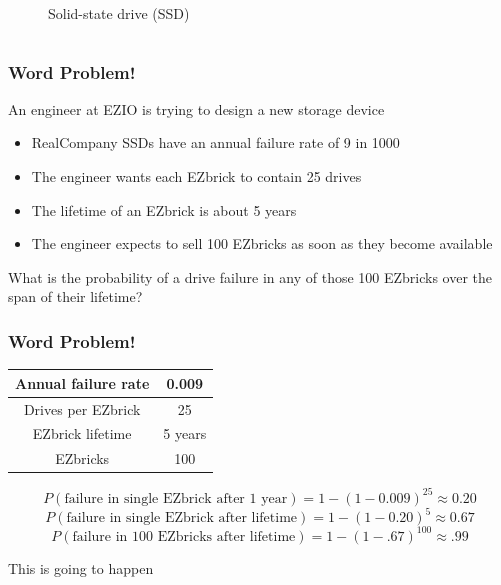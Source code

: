 \documentclass{beamer}
\theoremstyle{mystyle}
\begin{document}
\begin{frame}
\begin{columns}
\begin{figure}
			\caption{Solid-state drive (SSD)}
		\end{figure}
\end{columns}
\end{frame}


\begin{frame}
\frametitle{Word Problem!}
An engineer at EZIO is trying to design a new storage device
\vspace{0.2in}
	\begin{itemize}
		\item RealCompany SSDs have an annual failure rate of 9 in 1000
		\pause
		\vspace{0.1in}
		\item The engineer wants each EZbrick to contain 25 drives
		\pause
		\vspace{0.1in}
		\item The lifetime of an EZbrick is about 5 years
		\pause
		\vspace{0.1in} 
		\item The engineer expects to sell 100 EZbricks as soon as they become available
	\end{itemize}
\pause
\vspace{0.2in}
What is the probability of a drive failure in any of those 100 EZbricks over the span of their lifetime?

	
\end{frame}

\begin{frame}
\frametitle{Word Problem!}

\begin{center}
	\begin{tabular}{ | c | c | }
		\hline Annual failure rate & 0.009 \\
		\hline Drives per EZbrick & 25 \\
		\hline EZbrick lifetime & 5 years \\
		\hline EZbricks & 100 \\
		\hline 	
	\end{tabular}
\end{center}

\pause
\[ P(\text{failure in single EZbrick after 1 year} ) = 1 - (1 - 0.009)^{25} \approx 0.20\]
\pause
\[P(\text{failure in single EZbrick after lifetime} ) = 1 - (1 - 0.20)^5 \approx 0.67\]
\pause
\[P(\text{failure in 100 EZbricks after lifetime} ) = 1 - (1 -.67)^{100} \approx .99 \]
\pause
\begin{center}
This is going to happen
\end{center}
\end{frame}
\end{document}
